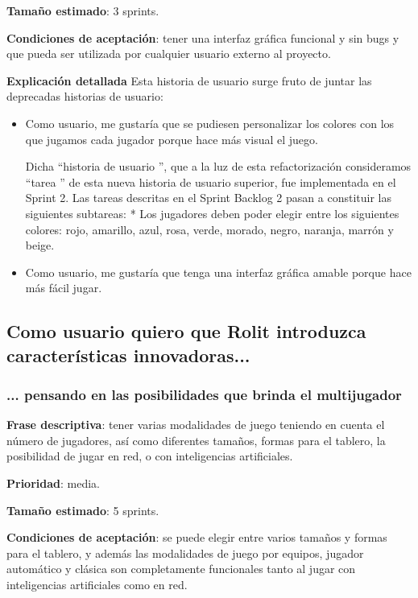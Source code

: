 \documentclass[../../SCRUM.tex]{subfiles}
\begin{document}
\textbf{Tamaño estimado}: 3 sprints.

\textbf{Condiciones de aceptación}: tener una interfaz gráfica funcional y sin bugs y que pueda ser utilizada por cualquier usuario externo al proyecto.

\textbf{Explicación detallada}
Esta historia de usuario surge fruto de juntar las deprecadas historias de usuario:
\begin{itemize}
\item  Como usuario, me gustaría que se pudiesen personalizar los colores con los que jugamos cada jugador porque hace más visual el juego. 

    Dicha  ``historia de usuario '', que a la luz de esta refactorización consideramos  ``tarea '' de esta nueva historia de usuario superior, fue implementada en el Sprint 2. Las tareas descritas en el Sprint Backlog 2 pasan a constituir las siguientes subtareas:
     * Los jugadores deben poder elegir entre los siguientes colores: rojo, amarillo, azul, rosa, verde, morado, negro, naranja, marrón y beige.

\item  Como usuario, me gustaría que tenga una interfaz gráfica amable porque hace más fácil jugar.
\end{itemize}

\subsection{Como usuario quiero que Rolit introduzca características innovadoras...}
\subsubsection{... pensando en las posibilidades que brinda el multijugador}
\textbf{Frase descriptiva}: tener varias modalidades de juego teniendo en cuenta el número de jugadores, así como diferentes tamaños, formas para el tablero, la posibilidad de jugar en red, o con inteligencias artificiales.

\textbf{Prioridad}: media.

\textbf{Tamaño estimado}: 5 sprints.

\textbf{Condiciones de aceptación}: se puede elegir entre varios tamaños y formas para el tablero, y además las modalidades de juego por equipos, jugador automático y clásica son completamente funcionales tanto al jugar con inteligencias artificiales como en red.
\end{document}
